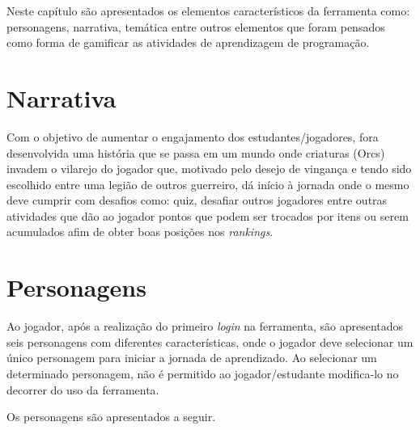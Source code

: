 Neste capítulo são apresentados os elementos característicos da ferramenta como: personagens, narrativa, temática entre outros 
elementos que foram pensados como forma de gamificar as atividades de aprendizagem de programação.

\section{Narrativa}

Com o objetivo de aumentar o engajamento dos estudantes/jogadores, fora desenvolvida uma história que se passa em um mundo 
onde criaturas (Orcs) invadem o vilarejo do jogador que, motivado pelo desejo de vingança e tendo sido escolhido entre uma legião 
de outros guerreiro, dá início à jornada onde o mesmo deve cumprir com desafios como: quiz, desafiar outros jogadores entre outras
atividades que dão ao jogador pontos que podem ser trocados por itens ou serem acumulados afim de obter boas posições nos \textit{rankings}.

\section{Personagens}

Ao jogador, após a realização do primeiro \textit{login} na ferramenta, são apresentados seis personagens com diferentes características, onde o jogador
deve selecionar um único personagem para iniciar a jornada de aprendizado. Ao selecionar um determinado personagem, não é permitido ao jogador/estudante 
modifica-lo no decorrer do uso da ferramenta.

Os personagens são apresentados a seguir.

